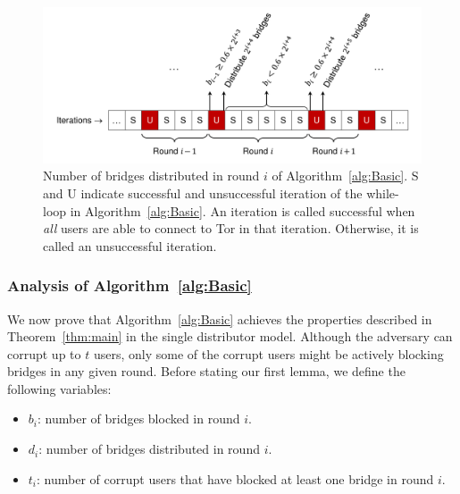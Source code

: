 \documentclass[letterpaper,twocolumn,10pt]{article}
\begin{document}
\begin{figure}
	\centering
	\includegraphics[width=0.85\linewidth]{images/rounds}
	\caption{Number of bridges distributed in round $i$ of Algorithm~\ref{alg:Basic}. S and U indicate successful and unsuccessful iteration of the while-loop in Algorithm~\ref{alg:Basic}. An iteration is called successful when \emph{all} users are able to connect to Tor in that iteration. Otherwise, it is called an unsuccessful iteration. }
	\label{fig:rounds}
\end{figure}

\subsubsection{Analysis of Algorithm~\ref{alg:Basic}} \label{sec:ProofBasic}
We now prove that Algorithm~\ref{alg:Basic} achieves the properties described in Theorem~\ref{thm:main} in the single distributor model. 
Although the adversary can corrupt up to $t$ users, only some of the corrupt users might be actively blocking bridges in any given round. %
Before stating our first lemma, we define the following variables:
\begin{itemize}
	\item $b_i$: number of bridges blocked in round $i$.	
	\item $d_i$: number of bridges distributed in round $i$.
	\item $t_i$: number of corrupt users that have blocked at least one bridge in round $i$.
\end{itemize}
\end{document}
